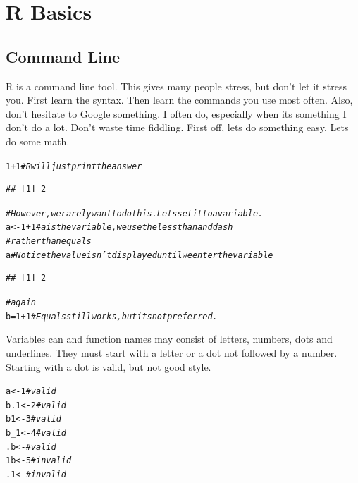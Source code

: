 \documentclass[draft]{article}\usepackage[]{graphicx}\usepackage[]{color}
\makeatletter
\newcommand{\hlnum}[1]{\textcolor[rgb]{0.686,0.059,0.569}{#1}}%
\newcommand{\hlcom}[1]{\textcolor[rgb]{0.678,0.584,0.686}{\textit{#1}}}%
\newcommand{\hlopt}[1]{\textcolor[rgb]{0,0,0}{#1}}%
\newcommand{\hlstd}[1]{\textcolor[rgb]{0.345,0.345,0.345}{#1}}%
\newcommand{\hlkwb}[1]{\textcolor[rgb]{0.69,0.353,0.396}{#1}}%
\newenvironment{kframe}{%
 \def\at@end@of@kframe{}%
 \ifinner\ifhmode%
  \def\at@end@of@kframe{\end{minipage}}%
  \begin{minipage}{\columnwidth}%
 \fi\fi%
 \def\FrameCommand##1{\hskip\@totalleftmargin \hskip-\fboxsep
 \colorbox{shadecolor}{##1}\hskip-\fboxsep
     \hskip-\linewidth \hskip-\@totalleftmargin \hskip\columnwidth}%
 \MakeFramed {\advance\hsize-\width
   \@totalleftmargin\z@ \linewidth\hsize
   \@setminipage}}%
 {\par\unskip\endMakeFramed%
 \at@end@of@kframe}
\newenvironment{knitrout}{}{} %
\makeatother
\begin{document}
  \section*{R Basics}
  
  \subsection*{Command Line}
    R is a command line tool. This gives many people stress, but don't let it stress you. First learn the syntax. Then learn the commands you use most often. Also, don't hesitate to Google something. I often do, especially when its something I don't do a lot. Don't waste time fiddling. 
    First off, lets do something easy. Lets do some math.
    
\begin{knitrout}
\color{fgcolor}\begin{kframe}
\begin{alltt}
\hlnum{1} \hlopt{+} \hlnum{1}  \hlcom{# R will just print the answer}
\end{alltt}
\begin{verbatim}
## [1] 2
\end{verbatim}
\begin{alltt}
\hlcom{# However, we rarely want to do this. Lets set it to a variable.}
\hlstd{a} \hlkwb{<-} \hlnum{1} \hlopt{+} \hlnum{1}  \hlcom{# a is the variable, we use the less than and dash }
            \hlcom{# rather than equals}
\hlstd{a} \hlcom{# Notice the value isn't displayed until we enter the variable}
\end{alltt}
\begin{verbatim}
## [1] 2
\end{verbatim}
\begin{alltt}
  \hlcom{# again}
\hlstd{b} \hlkwb{=} \hlnum{1} \hlopt{+} \hlnum{1} \hlcom{# Equals still works, but its not preferred. }
\end{alltt}
\end{kframe}
\end{knitrout}
    
    Variables can and function names may consist of letters, numbers, dots and underlines. They must start with a letter or a dot not followed by a number. Starting with a dot is valid, but not good style.
    
\begin{knitrout}
\color{fgcolor}\begin{kframe}
\begin{alltt}
a <- 1  \hlcom{# valid}
b.1 <- 2 \hlcom{# valid}
b1 <- 3 \hlcom{# valid}
b_1 <- 4 \hlcom{# valid }
.b <- \hlcom{# valid}
1b <- 5 \hlcom{# invalid}
.1 <- \hlcom{# invalid}
\end{alltt}
\end{kframe}
\end{knitrout}
    
\end{document}
